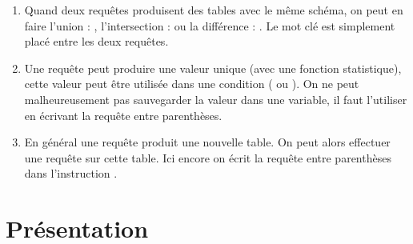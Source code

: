 \begin{enumerate}
    \item Quand deux requêtes produisent des tables avec le même schéma, on peut en faire l'union : , l'intersection :  ou la différence : . Le mot clé est simplement placé entre les deux requêtes.
    \item Une requête peut produire une valeur unique (avec une fonction statistique), cette valeur peut être utilisée dans une condition ( ou ). On ne peut malheureusement pas sauvegarder la valeur dans une variable, il faut l'utiliser en écrivant la requête entre parenthèses.
    \item En général une requête produit une nouvelle table. On peut alors effectuer une requête sur cette table. Ici encore on écrit la requête entre parenthèses dans l'instruction .
\end{enumerate}
\section{Présentation}

